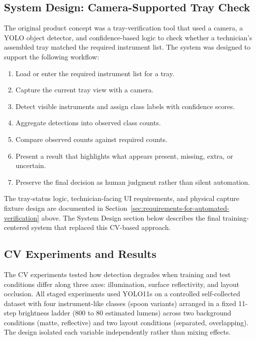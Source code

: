 \documentclass[10pt,a4paper]{article}
\begin{document}
\subsection{System Design: Camera-Supported Tray Check}
\label{sec:system-design-camera-supported-tray-check}


The original product concept was a tray-verification tool that used a camera,
a YOLO object detector, and confidence-based logic to check whether a
technician's assembled tray matched the required instrument list. The system
was designed to support the following workflow:

\begin{enumerate}
  \item Load or enter the required instrument list for a tray.
  \item Capture the current tray view with a camera.
  \item Detect visible instruments and assign class labels with confidence scores.
  \item Aggregate detections into observed class counts.
  \item Compare observed counts against required counts.
  \item Present a result that highlights what appears present, missing, extra, or uncertain.
  \item Preserve the final decision as human judgment rather than silent automation.
\end{enumerate}

The tray-status logic, technician-facing UI requirements, and physical capture
fixture design are documented in
Section~\ref{sec:requirements-for-automated-verification} above. The System
Design section below describes the final training-centered system that replaced
this CV-based approach.

\subsection{CV Experiments and Results}
\label{sec:computer-vision-experiments}

The CV experiments tested how detection degrades when training and test
conditions differ along three axes: illumination, surface reflectivity,
and layout occlusion. All staged experiments used YOLO11s on a controlled
self-collected dataset with four instrument-like classes (spoon variants)
arranged in a fixed 11-step brightness ladder (800 to 80 estimated lumens)
across two background conditions (matte, reflective) and two layout
conditions (separated, overlapping). The design isolated each variable
independently rather than mixing effects.
\end{document}
